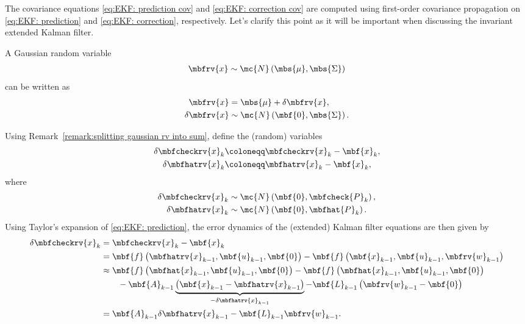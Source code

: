 \documentclass[nobib, nofonts, notoc]{tufte-handout}
\begin{document}
    The covariance equations \eqref{eq:EKF: prediction cov} and \eqref{eq:EKF: correction cov} are computed using first-order covariance propagation on \eqref{eq:EKF: prediction} and \eqref{eq:EKF: correction}, respectively. Let's clarify this point as it will be important when discussing the invariant extended Kalman filter.

    \begin{remark}    
        \label{remark:splitting gaussian rv into sum}
        A Gaussian random variable 
        \begin{align}
            \mbfrv{x}\sim\mc{N}\left( \mbs{\mu}, \mbs{\Sigma} \right)
        \end{align}
        can be written as
        \begin{align}
            \mbfrv{x} &= \mbs{\mu} + \delta\mbfrv{x},\\
            \delta\mbfrv{x} &\sim \mc{N}\left( \mbf{0}, \mbs{\Sigma} \right).
        \end{align}
    \end{remark}
    Using Remark~\ref{remark:splitting gaussian rv into sum}, define the (random) variables
    \begin{align}
        \label{eq:KF: prediction err. def.}
        \delta\mbfcheckrv{x}_{k} &\coloneqq \mbfcheckrv{x}_{k} -  \mbf{x}_{k},\\
        \label{eq:KF: correction err. def.}
        \delta\mbfhatrv{x}_{k} &\coloneqq \mbfhatrv{x}_{k} -  \mbf{x}_{k},
    \end{align}
    where
    \begin{align}
        \delta\mbfcheckrv{x}_{k} &\sim\mc{N}\left( \mbf{0}, \mbfcheck{P}_{k} \right),\\
        \delta\mbfhatrv{x}_{k} &\sim\mc{N}\left( \mbf{0}, \mbfhat{P}_{k} \right).
    \end{align}
    Using Taylor's expansion of \eqref{eq:EKF: prediction}, the error dynamics of the (extended) Kalman filter equations are then given by
    \begin{align}
        \delta\mbfcheckrv{x}_{k} 
        &= \mbfcheckrv{x}_{k} - \mbf{x}_{k} \\
        &= \mbf{f}\left( \mbfhatrv{x}_{k-1}, \mbf{u}_{k-1}, \mbf{0} \right) - \mbf{f}\left( \mbf{x}_{k-1}, \mbf{u}_{k-1}, \mbfrv{w}_{k-1} \right)\\
        &\approx \mbf{f}\left( \mbfhat{x}_{k-1}, \mbf{u}_{k-1}, \mbf{0} \right) - \mbf{f}\left( \mbfhat{x}_{k-1},\mbf{u}_{k-1}, \mbf{0} \right) 
            \nonumber\\&\qquad
            - \mbf{A}_{k-1}\underbrace{\left( \mbf{x}_{k-1} - \mbfhatrv{x}_{k-1} \right)}_{-\delta\mbfhatrv{x}_{k-1}} - \mbf{L}_{k-1}\left( \mbfrv{w}_{k-1} - \mbf{0} \right)\\
        &= \mbf{A}_{k-1}\delta\mbfhatrv{x}_{k-1} - \mbf{L}_{k-1}\mbfrv{w}_{k-1}.
    \end{align}
\end{document}
